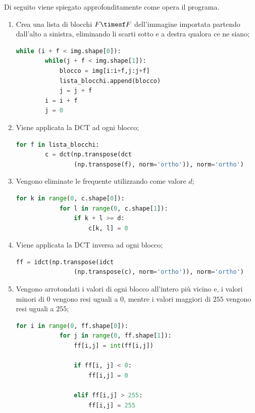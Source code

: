 \documentclass[preprint,12pt]{elsarticle}
\begin{document}
Di seguito viene spiegato approfonditamente come opera il programa.
\begin{enumerate}
\item Crea una lista di blocchi $F \timesf F$ dell'immagine importata partendo dall'alto a sinistra, eliminando li scarti sotto e a destra qualora ce ne siano;

\begin{lstlisting}[language=Python]
while (i + f < img.shape[0]):
        while(j + f < img.shape[1]):
            blocco = img[i:i+f,j:j+f]
            lista_blocchi.append(blocco)
            j = j + f
        i = i + f
        j = 0
\end{lstlisting}

\item Viene applicata la DCT ad ogni blocco;
\begin{lstlisting}[language=Python]
 for f in lista_blocchi:
        c = dct(np.transpose(dct
        		(np.transpose(f), norm='ortho')), norm='ortho')
\end{lstlisting}

\item Vengono eliminate le frequente utilizzando come valore $d$;
\begin{lstlisting}[language=Python]
for k in range(0, c.shape[0]):
            for l in range(0, c.shape[1]):
                if k + l >= d:
                    c[k, l] = 0
\end{lstlisting}

\item Viene applicata la DCT inversa ad ogni blocco;
\begin{lstlisting}[language=Python]
ff = idct(np.transpose(idct
				(np.transpose(c), norm='ortho')), norm='ortho')
\end{lstlisting}

\item Vengono arrotondati i valori di ogni blocco all'intero più vicino e, i valori minori di $0$ vengono resi uguali a $0$, mentre i valori maggiori di $255$ vengono resi uguali a $255$;
\begin{lstlisting}[language=Python]
for i in range(0, ff.shape[0]):
            for j in range(0, ff.shape[1]):
                ff[i,j] = int(ff[i,j])

                if ff[i, j] < 0:
                    ff[i,j] = 0
                    
                elif ff[i,j] > 255:
                    ff[i,j] = 255
\end{lstlisting}


\end{enumerate}
\end{document}

